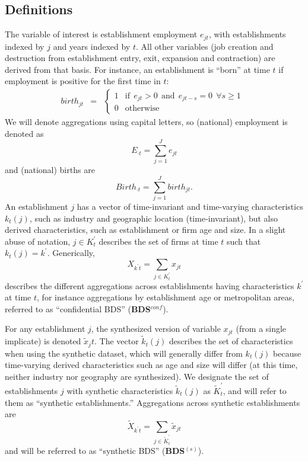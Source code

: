 \subsection{Definitions}
The variable of interest is establishment employment $e_{jt}$, with establishments indexed by 
$j$ and years indexed by $t$. All other variables (job creation and destruction from 
establishment entry, exit, expansion and contraction) are derived from that basis. For instance, 
an establishment is ``born'' at time $t$ if employment is positive for the first time in $t$:
\begin{eqnarray}
\label{eq:e_birth}
birth_{jt} &=& \left \lbrace 
\begin{array}{rl}
1 &\mbox{if}~~  e_{jt} > 0 ~~ \mbox{and}  ~~e_{jt-s} = 0 ~~\forall s\geq 1~~\\
0 &\mbox{otherwise}
\end{array} \right .
\end{eqnarray}
We will denote aggregations using capital letters, so (national) employment is denoted as
\begin{equation}
\label{eq:national_e}
E_{\cdot t} = \sum_{j=1}^J e_{jt}
\end{equation}
and (national) births are
\begin{equation}
\label{eq:national_birth}
Birth_{\cdot t} = \sum_{j=1}^J birth_{jt}.
\end{equation}
An establishment $j$ has a vector of  time-invariant and time-varying
characteristics $k_t(j)$, such as industry and geographic location (time-invariant), but also 
derived 
characteristics, such as establishment or firm age and size. In a slight abuse of notation, $j \in 
K_t^\prime$ describes the set of firms at time $t$ such that $k_t(j)=k^\prime$.   Generically, 
\begin{equation}
\label{eq:sum_X}
X_{k^\prime t} =  \sum_{j \in K_t^\prime} x_{jt}
\end{equation}
describes the different aggregations across establishments having characteristics $k^\prime$ at 
time $t$, for instance aggregations by establishment age or metropolitan areas, referred to as 
``confidential BDS'' (\textbf{BDS$^{conf}$}).
%

For any establishment $j$, the synthesized version of variable $x_{jt}$ (from a single implicate) is 
denoted $\tilde{x}_jt$. The vector $\tilde{k}_t(j)$ describes the set of characteristics when using 
the synthetic dataset, which will generally differ from $k_t(j)$ because time-varying derived 
characteristics such as age and size will differ (at this time, neither industry nor geography are 
synthesized). We designate the set of  establishments $j$ with synthetic characteristics 
$\tilde{k}_t(j)$ as $\tilde{K}_t^\prime$, and will refer to them as  ``synthetic 
establishments.''  Aggregations across synthetic establishments are
\begin{equation}
\label{eq:sum_X_synth}
\tilde{X}_{k^\prime t} =  \sum_{j \in \tilde{K}_t^\prime} \tilde{x}_{jt}
\end{equation}
and will be referred to as ``synthetic BDS'' (\textbf{BDS$^{(s)}$}).


